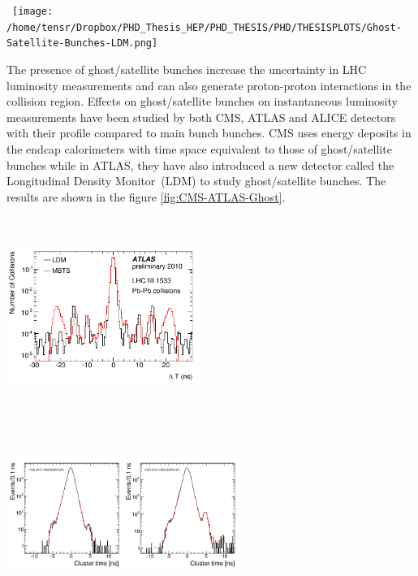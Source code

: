 \begin{center}
\centering
\mbox{
\texttt{[image: /home/tensr/Dropbox/PHD\_Thesis\_HEP/PHD\_THESIS/PHD/THESISPLOTS/Ghost-Satellite-Bunches-LDM.png]}} 
\label{fig:LDM-Ghost}
\end{center}
The presence of ghost/satellite bunches increase the uncertainty in LHC luminosity measurements and can also generate proton-proton interactions in the collision region. Effects on ghost/satellite bunches on instantaneous luminosity measurements have been studied by both CMS, ATLAS and ALICE detectors \cite{ATLAST-GHOST} 
with their profile compared to main bunch bunches. CMS uses energy deposits in the endcap calorimeters with time space equivalent to those of ghost/satellite bunches while in ATLAS, they have also introduced a new detector called the Longitudinal Density Monitor~(LDM) to study ghost/satellite bunches. The results are shown in the figure \eqref{fig:CMS-ATLAS-Ghost}.
\begin{center}
\centering
\mbox{\includegraphics[height=2.5in,width=2.5in]{THESISPLOTS/ATLAS-LDM-GHOST.png} \quad \quad
\includegraphics[height=2.5in,width=3.0in]{THESISPLOTS/CMS-Ghost-Profile.png}} 
\label{fig:CMS-ATLAS-Ghost}
\end{center}
